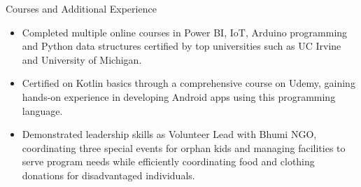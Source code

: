 \documentclass[]{mcdowellcv}
\begin{document}
	\begin{cvsection}{Courses and Additional Experience}
		\begin{cvsubsection}{}{}{}	
			\begin{itemize}
				\item Completed multiple online courses in Power BI, IoT, Arduino programming and Python data structures certified by top universities such as UC Irvine and University of Michigan.
				\item Certified on Kotlin basics through a comprehensive course on Udemy, gaining hands-on experience in developing Android apps using this programming language.
				\item Demonstrated leadership skills as Volunteer Lead with Bhumi NGO, coordinating three special events for orphan kids and managing facilities to serve program needs while efficiently coordinating food and clothing donations for disadvantaged individuals.
			\end{itemize}
		\end{cvsubsection}
	\end{cvsection}
	
	
\end{document}
